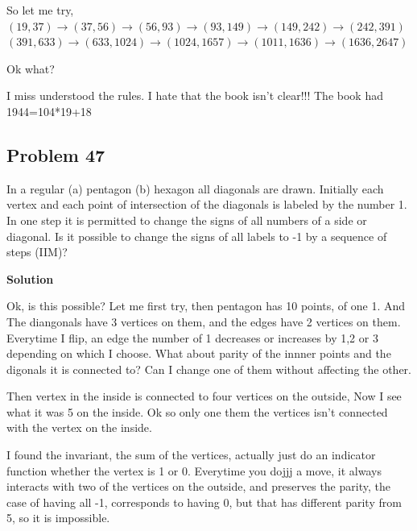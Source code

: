 \documentclass[12pt,tikz,border=10pt]{article}
\theoremstyle{definition}
\theoremstyle{remark}
\begin{document}
So let me try, $(19,37) \rightarrow (37,56) \rightarrow (56,93) \rightarrow (93,149) \rightarrow (149, 242) \rightarrow (242,391)$\\
$(391,633) \rightarrow (633,1024) \rightarrow (1024,1657) \rightarrow (1011,1636) \rightarrow (1636,2647)$ 



Ok what?

I miss understood the rules. I hate that the book isn't clear!!!
The book had 1944=104*19+18

\subsection{Problem 47}

In a regular (a) pentagon (b) hexagon all diagonals are drawn. Initially each vertex
and each point of intersection of the diagonals is labeled by the number 1. In one step
it is permitted to change the signs of all numbers of a side or diagonal. Is it possible
to change the signs of all labels to -1 by a sequence of steps (IIM)?

\textbf{Solution}

Ok, is this possible? Let me first try, then pentagon has 10 points, of one 1. And The diangonals have 3 vertices on them, and the
edges have 2 vertices on them. Everytime I flip, an edge the number of 1 decreases or increases by 1,2 or 3 depending on which I choose.
What about parity of the innner points and the digonals it is connected to? Can I change one of them without affecting the other.

Then vertex in the inside is connected to four vertices on the outside, Now I see what it was 5 on the inside. Ok so only one them
the vertices isn't connected with the vertex on the inside.


I found the invariant, the sum of the vertices, actually just do an indicator function whether the vertex is 1 or 0. Everytime you dojjj 
a move, it always interacts with two of the vertices on the outside, and preserves the parity, the case of having all -1, corresponds to 
having 0, but that has different parity from 5, so it is impossible.
\end{document}
